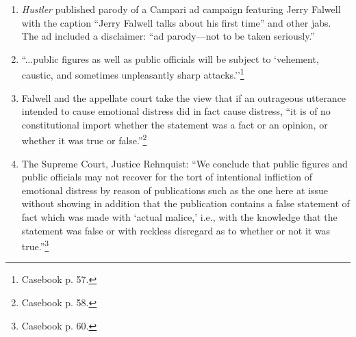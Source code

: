 \begin{enumerate}
    \item \emph{Hustler} published parody of a Campari ad campaign featuring 
    Jerry Falwell with the caption ``Jerry Falwell talks about his first 
    time'' and other jabs. The ad included a disclaimer: ``ad parody---not to 
    be taken seriously.''
    \item ``...public figures as well as public officials will be subject to 
    `vehement, caustic, and sometimes unpleasantly sharp 
    attacks.''\footnote{Casebook p. 57.}
    \item Falwell and the appellate court take the view that if an outrageous 
    utterance intended to cause emotional distress did in fact cause distress, 
    ``it is of no constitutional import whether the statement was a fact or an 
    opinion, or whether it was true or false.''\footnote{Casebook p. 58.}
    \item The Supreme Court, Justice Rehnquist: ``We conclude that public 
    figures and public officials may not recover for the tort of intentional 
    infliction of emotional distress by reason of publications such as the one 
    here at issue without showing in addition that the publication contains a 
    false statement of fact which was made with `actual malice,' i.e., with 
    the knowledge that the statement was false or with reckless disregard as 
    to whether or not it was true.''\footnote{Casebook p. 60.}
\end{enumerate}
